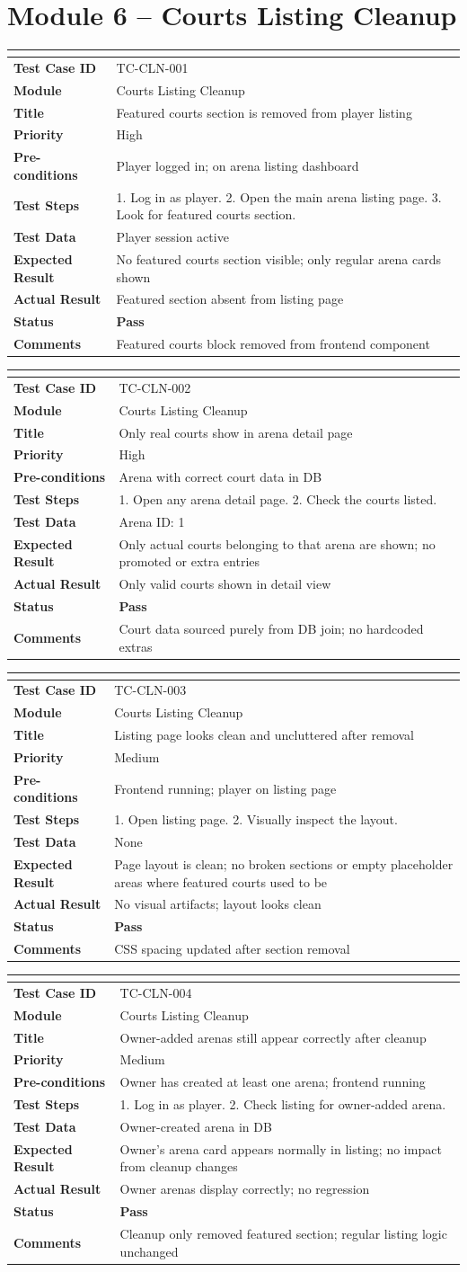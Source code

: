 \documentclass[12pt,a4paper]{article}
\newcommand{\pass}{\textcolor{passgreen}{\textbf{Pass}}}
\newcommand{\tcactual}[1]{Actual Result & #1 \\ \hline \rowcolor{rowgray}}
\newcommand{\tcstatus}[1]{Status & #1 \\ \hline}
\newcommand{\tccomment}[1]{Comments & #1 \\ \hline}
\newcommand{\testcase}[9]{%
\renewcommand{\arraystretch}{1.3}
\noindent\begin{tabularx}{\textwidth}{|>{\bfseries\small}p{3.5cm}|>{\small}X|}
\hline
\rowcolor{headerbg}\multicolumn{2}{|l|}{\color{white}\bfseries\small #1 -- #3}\\
\hline
Test Case ID    & #1 \\ \hline
\rowcolor{rowgray}
Module          & #2 \\ \hline
Title           & #3 \\ \hline
\rowcolor{rowgray}
Priority        & #4 \\ \hline
Pre-conditions  & #5 \\ \hline
\rowcolor{rowgray}
Test Steps      & #6 \\ \hline
Test Data       & #7 \\ \hline
\rowcolor{rowgray}
Expected Result & #8 \\ \hline
#9
\end{tabularx}
\vspace{0.7em}
}
\begin{document}
\newpage

\section{Module 6 -- Courts Listing Cleanup}

\testcase
  {TC-CLN-001}{Courts Listing Cleanup}{Featured courts section is removed from player listing}
  {High}
  {Player logged in; on arena listing dashboard}
  {1. Log in as player. 2. Open the main arena listing page. 3. Look for featured courts section.}
  {Player session active}
  {No featured courts section visible; only regular arena cards shown}
  {\tcactual{Featured section absent from listing page}\tcstatus{\pass}\tccomment{Featured courts block removed from frontend component}}

\testcase
  {TC-CLN-002}{Courts Listing Cleanup}{Only real courts show in arena detail page}
  {High}
  {Arena with correct court data in DB}
  {1. Open any arena detail page. 2. Check the courts listed.}
  {Arena ID: 1}
  {Only actual courts belonging to that arena are shown; no promoted or extra entries}
  {\tcactual{Only valid courts shown in detail view}\tcstatus{\pass}\tccomment{Court data sourced purely from DB join; no hardcoded extras}}

\testcase
  {TC-CLN-003}{Courts Listing Cleanup}{Listing page looks clean and uncluttered after removal}
  {Medium}
  {Frontend running; player on listing page}
  {1. Open listing page. 2. Visually inspect the layout.}
  {None}
  {Page layout is clean; no broken sections or empty placeholder areas where featured courts used to be}
  {\tcactual{No visual artifacts; layout looks clean}\tcstatus{\pass}\tccomment{CSS spacing updated after section removal}}

\testcase
  {TC-CLN-004}{Courts Listing Cleanup}{Owner-added arenas still appear correctly after cleanup}
  {Medium}
  {Owner has created at least one arena; frontend running}
  {1. Log in as player. 2. Check listing for owner-added arena.}
  {Owner-created arena in DB}
  {Owner's arena card appears normally in listing; no impact from cleanup changes}
  {\tcactual{Owner arenas display correctly; no regression}\tcstatus{\pass}\tccomment{Cleanup only removed featured section; regular listing logic unchanged}}

\newpage

\end{document}

